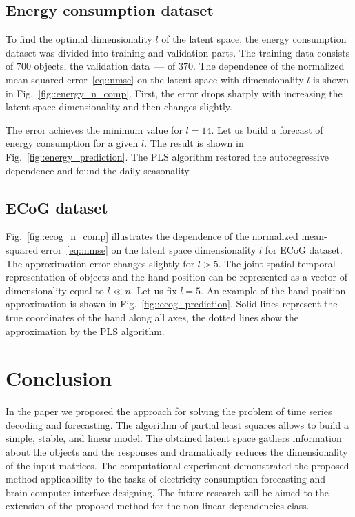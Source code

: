 \documentclass[12pt,twoside]{article}
\begin{document}
\subsection{Energy consumption dataset}

To find the optimal dimensionality $l$ of the latent space, the energy consumption dataset was divided into training and validation parts. 
The training data consists of $700$ objects, the validation data~--- of $370$. The dependence of the normalized mean-squared error~\eqref{eq::nmse} on the latent space with dimensionality $l$ is shown in Fig.~\ref{fig::energy_n_comp}. 
First, the error drops sharply with increasing the latent space dimensionality and then changes slightly.


The error achieves the minimum value for $l=14$. 
Let us build a forecast of energy consumption for a given $l$. 
The result is shown in Fig.~\ref{fig::energy_prediction}. 
The PLS algorithm restored the autoregressive dependence and found the daily seasonality.

\subsection{ECoG dataset}
Fig.~\ref{fig::ecog_n_comp} illustrates the dependence of the normalized mean-squared error~\eqref{eq::nmse} on the latent space dimensionality $l$ for ECoG dataset. 
The approximation error changes slightly for $l > 5$.
The joint spatial-temporal representation of objects and the hand position can be represented as a vector of dimensionality equal to $l \ll n$.
Let us fix $l = 5$. 
An example of the hand position approximation is shown in Fig.~\ref{fig::ecog_prediction}. 
Solid lines represent the true coordinates of the hand along all axes, the dotted lines show the approximation by the PLS algorithm.
 
\section{Conclusion}
In the paper we proposed the approach for solving the problem of time series decoding and forecasting. 
The algorithm of partial least squares allows to build a simple, stable, and linear model. 
The obtained latent space gathers information about the objects and the responses and dramatically reduces the dimensionality of the input matrices. 
The computational experiment demonstrated the proposed method applicability to the tasks of electricity consumption forecasting and brain-computer interface designing.
The future research will be aimed to the extension of the proposed method for the non-linear dependencies class.
\end{document}
